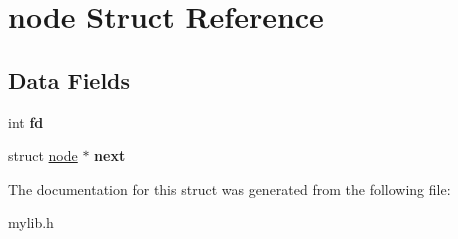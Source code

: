 \hypertarget{structnode}{}\section{node Struct Reference}
\label{structnode}
\subsection*{Data Fields}
\begin{DoxyCompactItemize}
\item 
\mbox{\label{structnode_a6f8059414f0228f0256115e024eeed4b}} 
int {\bfseries fd}
\item 
\mbox{\label{structnode_a0dc1b6470487aa86d9936e3cab8b95be}} 
struct \mbox{\hyperlink{structnode}{node}} $\ast$ {\bfseries next}
\end{DoxyCompactItemize}


The documentation for this struct was generated from the following file\+:\begin{DoxyCompactItemize}
\item 
mylib.\+h\end{DoxyCompactItemize}

